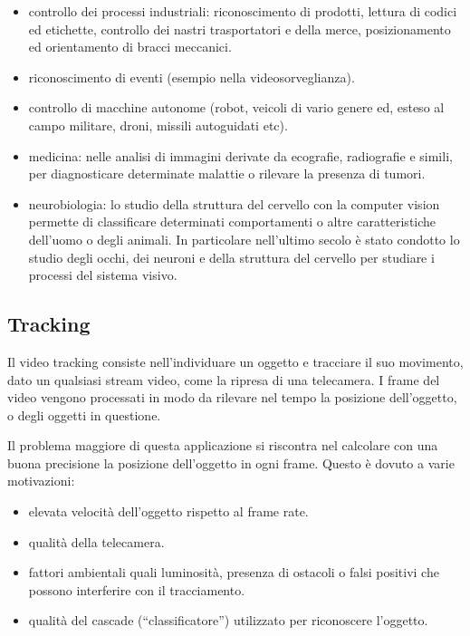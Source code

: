 \begin{itemize}
\item controllo dei processi industriali: riconoscimento di prodotti, lettura di codici ed etichette, controllo dei nastri trasportatori e della merce, posizionamento ed orientamento di bracci meccanici.
\item riconoscimento di eventi (esempio nella videosorveglianza).

\item controllo di macchine autonome (robot, veicoli di vario genere ed, esteso al campo militare, droni, missili autoguidati etc).

\item medicina: nelle analisi di immagini derivate da ecografie, radiografie e simili, per diagnosticare determinate malattie o rilevare la presenza di tumori.

\item neurobiologia: lo studio della struttura del cervello con la computer vision permette di classificare determinati comportamenti o altre caratteristiche dell'uomo o degli animali.
In particolare nell'ultimo secolo è stato condotto lo studio degli occhi, dei neuroni e della struttura del cervello per studiare i processi del sistema visivo. 

\end{itemize}

\subsection{Tracking}
Il video tracking consiste nell'individuare un oggetto e tracciare il suo movimento, dato un qualsiasi stream video, come la ripresa di una telecamera. I frame del video vengono processati in modo da rilevare nel tempo la posizione dell'oggetto, o degli oggetti in questione. 

Il problema maggiore di questa applicazione si riscontra nel calcolare con una buona precisione la posizione dell'oggetto in ogni frame.
Questo è dovuto a varie motivazioni:
\begin{itemize}
\item elevata velocità dell'oggetto rispetto al frame rate.
\item qualità della telecamera.
\item fattori ambientali quali luminosità, presenza di ostacoli o falsi positivi che possono interferire con il tracciamento.
\item qualità del cascade (“classificatore”) utilizzato per riconoscere l'oggetto.
\end{itemize}

